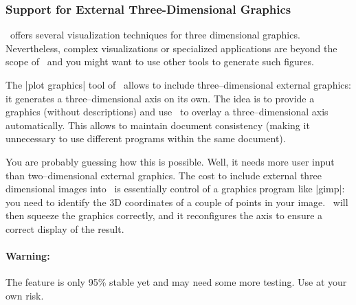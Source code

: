 {{
	
\subsubsection*{Support for External Three-Dimensional Graphics}
\label{sec:plotgraphics3d}
\PGFPlots\ offers several visualization techniques for three dimensional graphics. Nevertheless, complex visualizations or specialized applications are beyond the scope of \PGFPlots\ and you might want to use other tools to generate such figures. 

The |plot graphics| tool of \PGFPlots\ allows to include three--dimensional external graphics: it generates a three--dimensional axis on its own. The idea is to provide a graphics (without descriptions) and use \PGFPlots\ to overlay a three--dimensional axis automatically. This allows to maintain document consistency (making it unnecessary to use different programs within the same document). 

You are probably guessing how this is possible. Well, it needs more user input than two--dimensional external graphics. The cost to include external three dimensional images into \PGFPlots\ is essentially control of a graphics program like |gimp|: you need to identify the 3D coordinates of a couple of points in your image. \PGFPlots\ will then squeeze the graphics correctly, and it reconfigures the axis to ensure a correct display of the result.

\paragraph{Warning:} The feature is only 95\% stable yet and may need some more testing. Use at your own risk.

}}
